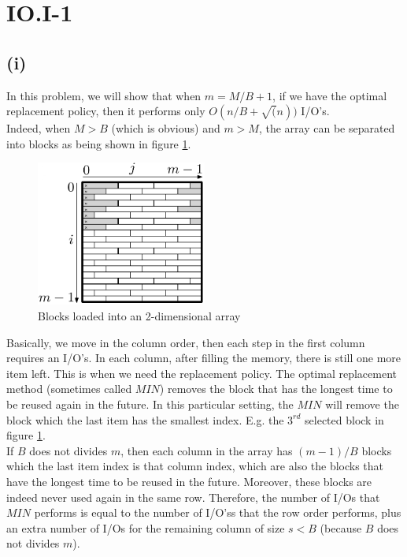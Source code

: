 \section*{IO.I-1}
\subsection*{(i)}
In this problem, we will show that when $m = M/B + 1$, if we have the optimal replacement policy, then it performs only $O(n/B + \sqrt(n))$ I/O's.\\

Indeed, when $M > B$ (which is obvious) and $m > M$, the array can be separated into blocks as being shown in figure \ref{fig:row-major}. \\

\begin{figure}
  \centering
  \includegraphics[width=0.5\textwidth]{row-major}
  \caption{Blocks loaded into an 2-dimensional array}
  \label{fig:row-major}
\end{figure}

Basically, we move in the column order, then each step in the first column requires an I/O's. In each column, after filling the memory, there is still one more item left. This is when we need the replacement policy. The optimal replacement method (sometimes called $MIN$) removes the block that has the longest time to be reused again in the future. In this particular setting, the $MIN$ will remove the block which the last item has the smallest index. E.g. the $3^{rd}$ selected block in figure \ref{fig:row-major}.\\

If $B$ does not divides $m$, then each column in the array has $(m - 1) / B$ blocks which the last item index is that column index, which are also the blocks that have the longest time to be reused in the future. Moreover, these blocks are indeed never used again in the same row. Therefore, the number of I/Os that $MIN$ performs is equal to the number of I/O'ss that the row order performs, plus an extra number of I/Os for the remaining column of size $s < B$ (because $B$ does not divides $m$).\\

